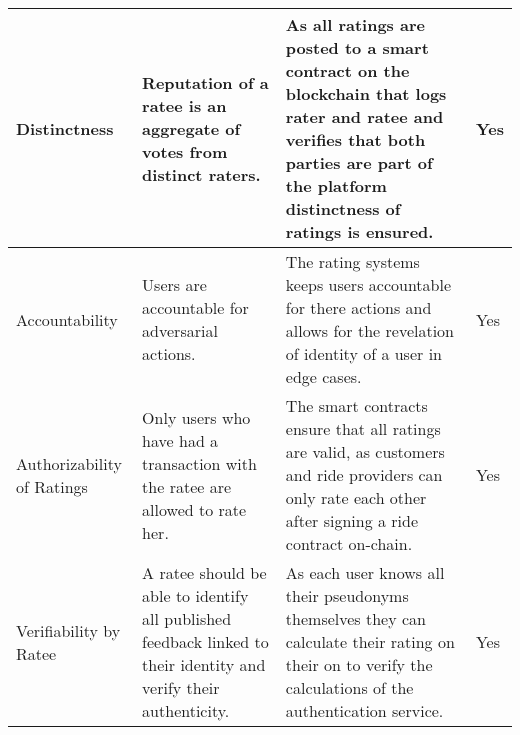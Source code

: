 \begin{longtable}{|p{3cm}|p{4.5cm}|p{5cm}|p{1.5cm}|}
\hline
Distinctness & Reputation of a ratee is an aggregate of votes from distinct raters. & As all ratings are posted to a smart contract on the blockchain that logs rater and ratee and verifies that both parties are part of the platform distinctness of ratings is ensured. & Yes\\
\hline
Accountability & Users are accountable for adversarial actions. & The rating systems keeps users accountable for there actions and allows for the revelation of identity of a user in edge cases.& Yes\\
\hline
Authorizability of Ratings & Only users who have had a transaction with the ratee are allowed to rate her. & The smart contracts ensure that all ratings are valid, as customers and ride providers can only rate each other after signing a ride contract on-chain.& Yes\\
\hline
Verifiability by Ratee & A ratee should be able to identify all published feedback linked to their identity and verify their authenticity. &As each user knows all their pseudonyms themselves they can calculate their rating on their on to verify the calculations of the authentication service.  & Yes\\
\hline
\end{longtable}
